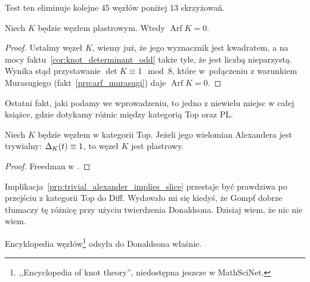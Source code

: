 Test ten eliminuje kolejne 45 węzłów poniżej 13 skrzyżowań.

\begin{proposition}
    Niech $K$ będzie węzłem plastrowym.
    Wtedy $\operatorname{Arf} K = 0$.
\end{proposition}

\begin{proof}
    Ustalmy węzeł $K$, wiemy już, że jego wyznacznik jest kwadratem, a na mocy faktu~\ref{cor:knot_determinant_odd} także tyle, że jest liczbą nieparzystą.
    Wynika stąd przystawanie $\det K \equiv 1 \mod 8$, które w~połączeniu z warunkiem Murasugiego (fakt~\ref{prp:arf_murasugi}) daje $\operatorname{Arf} K = 0$.
\end{proof}


Ostatni fakt, jaki podamy we wprowadzeniu, to jedno z niewielu miejsc w całej książce, gdzie dotykamy różnic między kategorią Top oraz PL.

\begin{proposition}
\label{prp:trivial_alexander_implies_slice}%
    Niech $K$ będzie węzłem w kategorii Top.
    Jeżeli jego wielomian Alexandera jest trywialny: $\Delta_K(t) \equiv 1$, to węzeł $K$ jest plastrowy.
\end{proposition}

\begin{proof}
%
    Freedman w \cite[tw. 1.13]{freedman82}.
\end{proof}

Implikacja~\ref{prp:trivial_alexander_implies_slice} przestaje być prawdziwa po przejściu z kategorii Top do Diff.
Wydawało mi się kiedyś, że Gompf \cite{gompf86} dobrze tłumaczy tę różnicę przy użyciu twierdzenia Donaldsona.
%
Dzisiaj wiem, że nic nie wiem.

Encyklopedia węzłów\footnote{,,Encyclopedia of knot theory'', niedostępna jeszcze w MathSciNet.} \cite{citation_missing_on_purpose} odsyła do Donaldsona \cite{donaldson83} właśnie.










